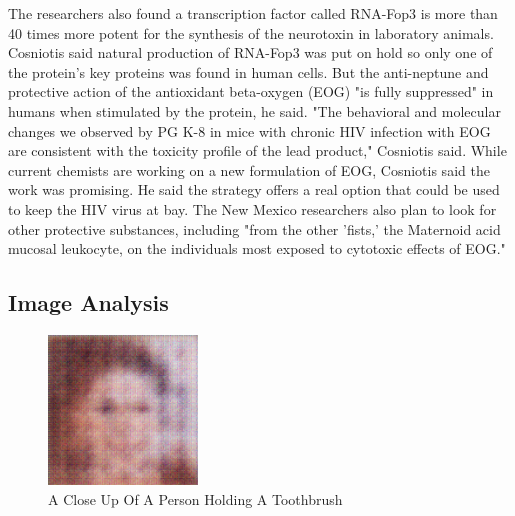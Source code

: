 \documentclass{article}%
\begin{document}
The researchers also found a transcription factor called RNA{-}Fop3 is more than 40 times more potent for the synthesis of the neurotoxin in laboratory animals.\newline%
Cosniotis said natural production of RNA{-}Fop3 was put on hold so only one of the protein's key proteins was found in human cells.\newline%
But the anti{-}neptune and protective action of the antioxidant beta{-}oxygen (EOG) "is fully suppressed" in humans when stimulated by the protein, he said.\newline%
"The behavioral and molecular changes we observed by PG K{-}8 in mice with chronic HIV infection with EOG are consistent with the toxicity profile of the lead product," Cosniotis said.\newline%
While current chemists are working on a new formulation of EOG, Cosniotis said the work was promising.\newline%
He said the strategy offers a real option that could be used to keep the HIV virus at bay.\newline%
The New Mexico researchers also plan to look for other protective substances, including "from the other 'fists,' the Maternoid acid mucosal leukocyte, on the individuals most exposed to cytotoxic effects of EOG."

%
\subsection{Image Analysis}%
\label{subsec:ImageAnalysis}%


\begin{figure}[h!]%
\centering%
\includegraphics[width=150px]{500_fake_images/samples_5_295.png}%
\caption{A Close Up Of A Person Holding A Toothbrush}%
\end{figure}

%
\end{document}
